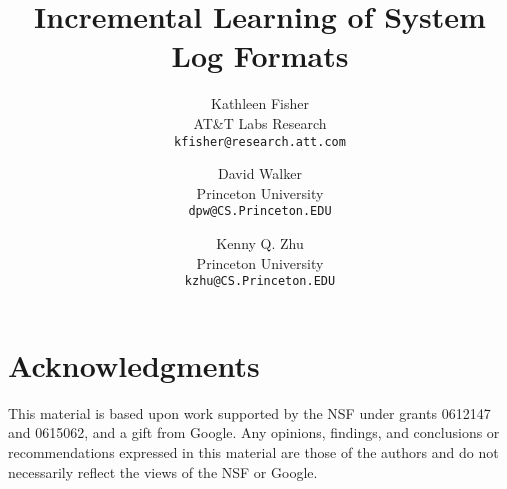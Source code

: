 \documentclass[twocolumn,10pt]{article}
\title{Incremental Learning of System Log Formats}
\author{Kathleen Fisher \\
	   AT\&T Labs Research\\
       {\small \tt kfisher@research.att.com}
	\and David Walker \\
	   Princeton University\\
       {\small \tt dpw@CS.Princeton.EDU}
	\and Kenny Q. Zhu \\
	   Princeton University\\
       {\small \tt kzhu@CS.Princeton.EDU}}
\date{}
\begin{document}


\twocolumn[\maketitle]



%
%












\small
\section*{Acknowledgments}
This material is based upon work
 supported by the NSF under grants 0612147 and 0615062, and
a gift from Google. Any opinions, findings, and conclusions or recommendations
expressed in this material are those of the authors and do not
necessarily reflect the views of the NSF or Google.


%



%
\end{document}
